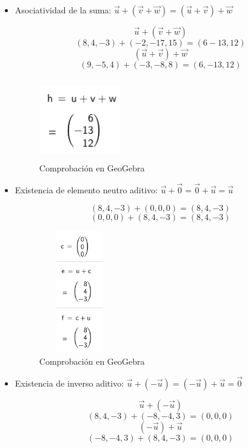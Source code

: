 \begin{itemize}
    \item Asociatividad de la suma: \(\vec{u}+(\vec{v}+\vec{w})=(\vec{u}+\vec{v})+\vec{w}\)
    
    \[
        \vec{u}+(\vec{v}+\vec{w})
    \]
    \[
        (8,4,-3)+(-2,-17,15)=(6-13,12)
    \]
    \[
        (\vec{u}+\vec{v})+\vec{w}
    \]
    \[
        (9,-5,4)+(-3,-8,8)=(6,-13,12)
    \]

    \begin{figure}[ht!]
        \centering
        \includegraphics[width=100pt,height=100pt]{img/imagen3.png}
        \caption{Comprobación en GeoGebra}
    \end{figure}

    \item Existencia de elemento neutro aditivo: \(\vec{u}+\vec{0}=\vec{0}+\vec{u}=\vec{u}\)
    

    \[
        (8,4,-3)+(0,0,0)=(8,4,-3)
    \]
    \[
        (0,0,0)+(8,4,-3)=(8,4,-3)
    \]

    \begin{figure}[ht!]
        \centering
        \includegraphics[width=100pt,height=150pt]{img/imagen4.png}
        \caption{Comprobación en GeoGebra}
    \end{figure}

    \FloatBarrier
    \item Existencia de inverso aditivo: \(\vec{u}+(-\vec{u})=(-\vec{u})+\vec{u}=\vec{0}\)
    
    \[
        \vec{u}+(-\vec{u})
    \]
    \[
        (8,4,-3)+(-8,-4,3)=(0,0,0)
    \]
    \[
        (-\vec{u})+\vec{u}
    \]
    \[
        (-8,-4,3)+(8,4,-3)=(0,0,0)
    \]


\end{itemize}
